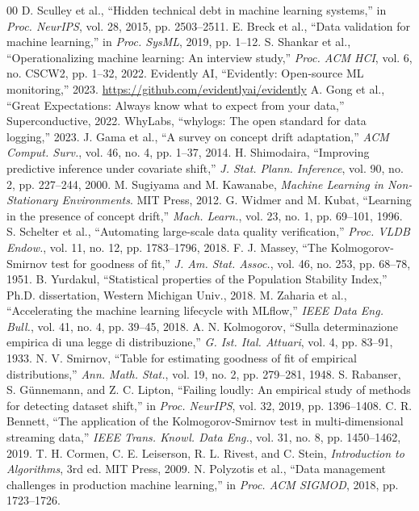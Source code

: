 \documentclass[conference]{IEEEtran}
\begin{document}
\begin{thebibliography}{00}
 D. Sculley et al., ``Hidden technical debt in machine learning systems,'' in \textit{Proc. NeurIPS}, vol. 28, 2015, pp. 2503--2511.
 E. Breck et al., ``Data validation for machine learning,'' in \textit{Proc. SysML}, 2019, pp. 1--12.
 S. Shankar et al., ``Operationalizing machine learning: An interview study,'' \textit{Proc. ACM HCI}, vol. 6, no. CSCW2, pp. 1--32, 2022.
 Evidently AI, ``Evidently: Open-source ML monitoring,'' 2023. \url{https://github.com/evidentlyai/evidently}
 A. Gong et al., ``Great Expectations: Always know what to expect from your data,'' Superconductive, 2022.
 WhyLabs, ``whylogs: The open standard for data logging,'' 2023.
 J. Gama et al., ``A survey on concept drift adaptation,'' \textit{ACM Comput. Surv.}, vol. 46, no. 4, pp. 1--37, 2014.
 H. Shimodaira, ``Improving predictive inference under covariate shift,'' \textit{J. Stat. Plann. Inference}, vol. 90, no. 2, pp. 227--244, 2000.
 M. Sugiyama and M. Kawanabe, \textit{Machine Learning in Non-Stationary Environments}. MIT Press, 2012.
 G. Widmer and M. Kubat, ``Learning in the presence of concept drift,'' \textit{Mach. Learn.}, vol. 23, no. 1, pp. 69--101, 1996.
 S. Schelter et al., ``Automating large-scale data quality verification,'' \textit{Proc. VLDB Endow.}, vol. 11, no. 12, pp. 1783--1796, 2018.
 F. J. Massey, ``The Kolmogorov-Smirnov test for goodness of fit,'' \textit{J. Am. Stat. Assoc.}, vol. 46, no. 253, pp. 68--78, 1951.
 B. Yurdakul, ``Statistical properties of the Population Stability Index,'' Ph.D. dissertation, Western Michigan Univ., 2018.
 M. Zaharia et al., ``Accelerating the machine learning lifecycle with MLflow,'' \textit{IEEE Data Eng. Bull.}, vol. 41, no. 4, pp. 39--45, 2018.
 A. N. Kolmogorov, ``Sulla determinazione empirica di una legge di distribuzione,'' \textit{G. Ist. Ital. Attuari}, vol. 4, pp. 83--91, 1933.
 N. V. Smirnov, ``Table for estimating goodness of fit of empirical distributions,'' \textit{Ann. Math. Stat.}, vol. 19, no. 2, pp. 279--281, 1948.
 S. Rabanser, S. G{\"u}nnemann, and Z. C. Lipton, ``Failing loudly: An empirical study of methods for detecting dataset shift,'' in \textit{Proc. NeurIPS}, vol. 32, 2019, pp. 1396--1408.
 C. R. Bennett, ``The application of the Kolmogorov-Smirnov test in multi-dimensional streaming data,'' \textit{IEEE Trans. Knowl. Data Eng.}, vol. 31, no. 8, pp. 1450--1462, 2019.
 T. H. Cormen, C. E. Leiserson, R. L. Rivest, and C. Stein, \textit{Introduction to Algorithms}, 3rd ed. MIT Press, 2009.
 N. Polyzotis et al., ``Data management challenges in production machine learning,'' in \textit{Proc. ACM SIGMOD}, 2018, pp. 1723--1726.
\end{thebibliography}
\end{document}
